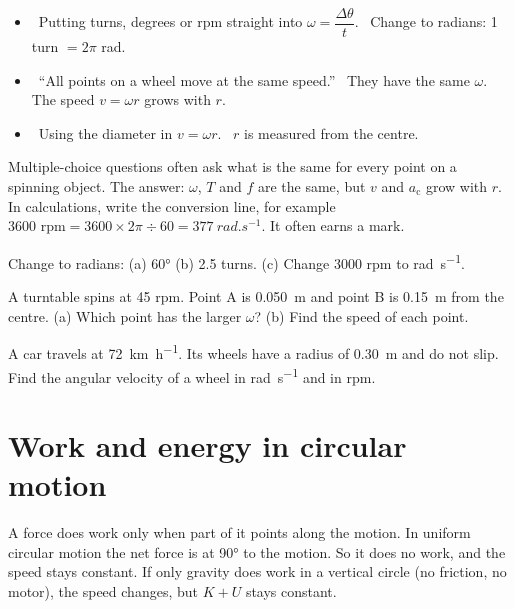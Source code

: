 \begin{mistakes}
\begin{itemize}
  \item \xmark\ Putting turns, degrees or rpm straight into $\omega = \dfrac{\Delta\theta}{t}$.
        \cmark\ Change to radians: 1 turn $= 2\pi$ rad.
  \item \xmark\ ``All points on a wheel move at the same speed.''
        \cmark\ They have the same $\omega$. The speed $v = \omega r$ grows with $r$.
  \item \xmark\ Using the diameter in $v = \omega r$. \cmark\ $r$ is measured from the centre.
\end{itemize}
\end{mistakes}

\begin{examtip}
Multiple-choice questions often ask what is the same for every point on a spinning object.
The answer: $\omega$, $T$ and $f$ are the same, but $v$ and $a_\mathrm{c}$ grow with $r$. In calculations, write the
conversion line, for example $3600 \text{ rpm} = 3600 \times 2\pi \div 60 =
\qty{377}{rad.s^{-1}}$. It often earns a mark.
\end{examtip}

\begin{quickcheck}
  \item Change to radians: (a) \ang{60} \quad (b) 2.5 turns. (c) Change 3000 rpm to \si{rad.s^{-1}}.
  \item A turntable spins at 45 rpm. Point A is \qty{0.050}{m} and point B is \qty{0.15}{m} from
        the centre. (a) Which point has the larger $\omega$? (b) Find the speed of each point.
  \item A car travels at \qty{72}{km.h^{-1}}. Its wheels have a radius of \qty{0.30}{m} and do not
        slip. Find the angular velocity of a wheel in \si{rad.s^{-1}} and in rpm.
\end{quickcheck}

\section{Work and energy in circular motion}\label{ch3:sec:work}

\begin{bigidea}
A force does work only when part of it points along the motion. In uniform circular motion
the net force is at \ang{90} to the motion. So it does no work, and the speed stays constant.
If only gravity does work in a vertical circle (no friction, no motor), the speed changes,
but $K + U$ stays constant.
\end{bigidea}

